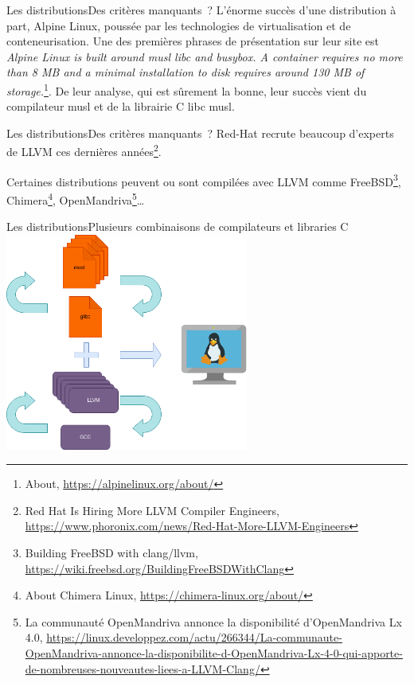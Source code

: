 \documentclass{beamer}
\begin{document}
    \begin{frame}{Les distributions}{Des critères manquants~?}
        L'énorme succès d'une distribution à part, Alpine Linux, poussée par les technologies de virtualisation et de conteneurisation.
        \bigbreak
        Une des premières phrases de présentation sur leur site est \textit{Alpine Linux is built around musl libc and busybox. A container requires no more than 8 MB and a minimal installation to disk requires around 130 MB of storage.}\footnote{About, \url{https://alpinelinux.org/about/}}.
        \bigbreak
        De leur analyse, qui est sûrement la bonne, leur succès vient du compilateur musl et de la librairie C libc musl.
    \end{frame}

    \begin{frame}{Les distributions}{Des critères manquants~?}
        Red-Hat recrute beaucoup d'experts de LLVM ces dernières années\footnote{Red Hat Is Hiring More LLVM Compiler Engineers, \url{https://www.phoronix.com/news/Red-Hat-More-LLVM-Engineers}}.

        Certaines distributions peuvent ou sont compilées avec LLVM comme FreeBSD\footnote{Building FreeBSD with clang/llvm, \url{https://wiki.freebsd.org/BuildingFreeBSDWithClang}}, Chimera\footnote{About Chimera Linux, \url{https://chimera-linux.org/about/}}, OpenMandriva\footnote{La communauté OpenMandriva annonce la disponibilité d'OpenMandriva Lx 4.0, \url{https://linux.developpez.com/actu/266344/La-communaute-OpenMandriva-annonce-la-disponibilite-d-OpenMandriva-Lx-4-0-qui-apporte-de-nombreuses-nouveautes-liees-a-LLVM-Clang/}}\ldots
    \end{frame}

    \begin{frame}{Les distributions}{Plusieurs combinaisons de compilateurs et libraries C}
        \centering
        \includegraphics[width=8cm]{image/interchange-lib-compiler.drawio}
    \end{frame}
\end{document}
